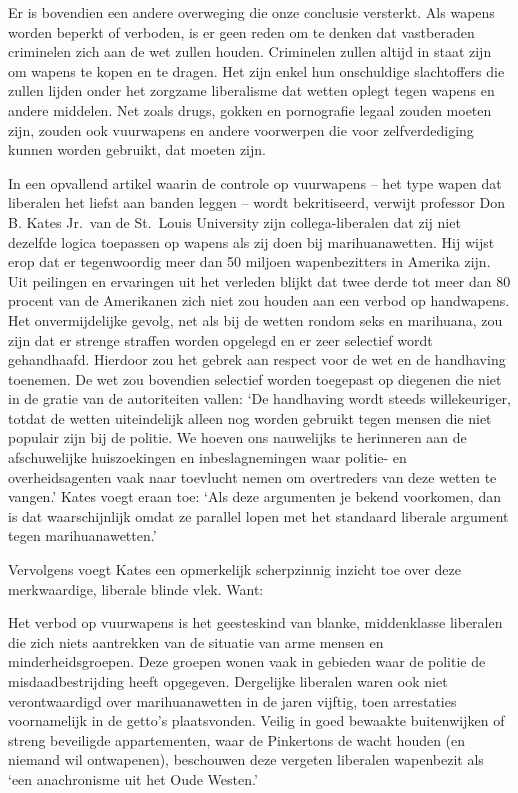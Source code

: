 \documentclass[
  a5paper,
  smalldemyvopaper,10pt,twoside,onecolumn,openright,extrafontsizes,hidelinks]{memoir}
\renewenvironment{quote}%
               {\list{}{\rightmargin=.6cm\leftmargin=.6cm}%
                \itshape \item[]}%
               {\endlist}
\begin{document}
Er is bovendien een andere overweging die onze conclusie versterkt. Als
wapens worden beperkt of verboden, is er geen reden om te denken dat
vastberaden criminelen zich aan de wet zullen houden. Criminelen zullen
altijd in staat zijn om wapens te kopen en te dragen. Het zijn enkel hun
onschuldige slachtoffers die zullen lijden onder het zorgzame
liberalisme dat wetten oplegt tegen wapens en andere middelen. Net zoals
drugs, gokken en pornografie legaal zouden moeten zijn, zouden ook
vuurwapens en andere voorwerpen die voor zelfverdediging kunnen worden
gebruikt, dat moeten zijn.

In een opvallend artikel waarin de controle op vuurwapens -- het type
wapen dat liberalen het liefst aan banden leggen -- wordt bekritiseerd,
verwijt professor Don B. Kates Jr.~van de St.~Louis University zijn
collega-liberalen dat zij niet dezelfde logica toepassen op wapens als
zij doen bij marihuanawetten. Hij wijst erop dat er tegenwoordig meer
dan 50 miljoen wapenbezitters in Amerika zijn. Uit peilingen en
ervaringen uit het verleden blijkt dat twee derde tot meer dan 80
procent van de Amerikanen zich niet zou houden aan een verbod op
handwapens. Het onvermijdelijke gevolg, net als bij de wetten rondom
seks en marihuana, zou zijn dat er strenge straffen worden opgelegd en
er zeer selectief wordt gehandhaafd. Hierdoor zou het gebrek aan respect
voor de wet en de handhaving toenemen. De wet zou bovendien selectief
worden toegepast op diegenen die niet in de gratie van de autoriteiten
vallen: `De handhaving wordt steeds willekeuriger, totdat de wetten
uiteindelijk alleen nog worden gebruikt tegen mensen die niet populair
zijn bij de politie. We hoeven ons nauwelijks te herinneren aan de
afschuwelijke huiszoekingen en inbeslagnemingen waar politie- en
overheidsagenten vaak naar toevlucht nemen om overtreders van deze
wetten te vangen.' Kates voegt eraan toe: `Als deze argumenten je bekend
voorkomen, dan is dat waarschijnlijk omdat ze parallel lopen met het
standaard liberale argument tegen marihuanawetten.'

Vervolgens voegt Kates een opmerkelijk scherpzinnig inzicht toe over
deze merkwaardige, liberale blinde vlek. Want:

\begin{quote}
Het verbod op vuurwapens is het geesteskind van blanke, middenklasse
liberalen die zich niets aantrekken van de situatie van arme mensen en
minderheidsgroepen. Deze groepen wonen vaak in gebieden waar de politie
de misdaadbestrijding heeft opgegeven. Dergelijke liberalen waren ook
niet verontwaardigd over marihuanawetten in de jaren vijftig, toen
arrestaties voornamelijk in de getto's plaatsvonden. Veilig in goed
bewaakte buitenwijken of streng beveiligde appartementen, waar de
Pinkertons de wacht houden (en niemand wil ontwapenen), beschouwen deze
vergeten liberalen wapenbezit als `een anachronisme uit het Oude
Westen.'
\end{quote}
\end{document}

